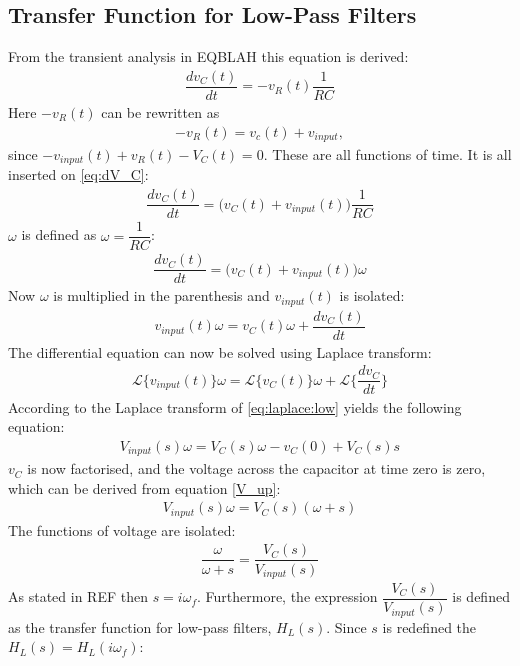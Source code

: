 \subsection{Transfer Function for Low-Pass Filters}
From the transient analysis in EQBLAH this equation is derived:
\begin{align} \label{eq:dV_C}
\dfrac{dv_C(t)}{dt}=-v_R(t)\dfrac{1}{RC}
\end{align}
Here $-v_{R}(t)$ can be rewritten as 
\begin{align} \label{eq:vr}
-v_{R}(t) = v_{c}(t) + v_{input}, 
\end{align}
since $-v_{input}(t)+v_{R}(t)-V_{C}(t)=0$. These are all functions of time. It is all inserted on \eqref{eq:dV_C}:
\begin{align} 
\dfrac{dv_C(t)}{dt}=\Big(v_C(t) + v_{input}(t)\Big)\dfrac{1}{RC}
\end{align}
$\omega$ is defined as $\omega=\dfrac{1}{RC}$:
\begin{align}
\dfrac{dv_C(t)}{dt}=\Big(v_C(t)+v_{input}(t)\Big)\omega
\end{align}
Now $\omega$ is multiplied in the parenthesis and $v_{input}(t)$ is isolated:
\begin{align}
v_{input}(t)\omega=v_C(t)\omega+\dfrac{dv_C(t)}{dt}
\end{align}
The differential equation can now be solved using Laplace transform:
\begin{align}\label{eq:laplace:low}
\mathcal{L}\Big\{v_{input}(t)\Big\}\omega=\mathcal{L}\Big\{v_C(t)\Big\}\omega+\mathcal{L}\bigg\{\dfrac{dv_C}{dt}\bigg\}
\end{align}
According to  the Laplace transform of \eqref{eq:laplace:low} yields the following equation:
\begin{align}
V_{input}(s)\omega=V_{C}(s)\omega-v_{C}(0)+V_{C}(s)s
\end{align} 
$v_{C}$ is now factorised, and the voltage across the capacitor at time zero is zero, which can be derived from equation \eqref{V_up}:
\begin{align}
V_{input}(s)\omega=V_{C}(s)(\omega+s)
\end{align} 
The functions of voltage are isolated:
\begin{align}
\dfrac{\omega}{\omega+s} = \dfrac{V_{C}(s)}{V_{input}(s)}
\end{align} 
As stated in REF then $s=i \omega_f$. Furthermore, the expression $\dfrac{V_{C}(s)}{V_{input}(s)}$ is defined as the transfer function for low-pass filters, $H_{L}(s)$. Since $s$ is redefined the $H_{L}(s)=H_{L}(i \omega_f)$:
